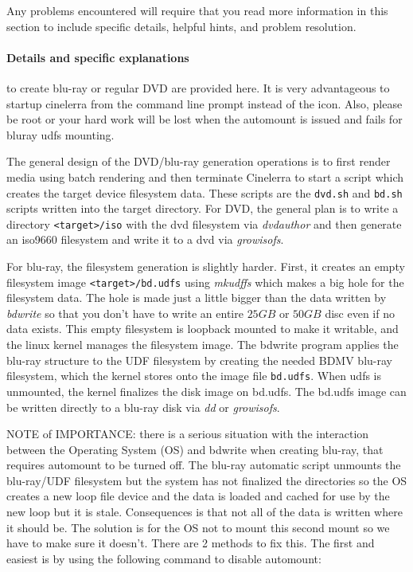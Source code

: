 Any problems encountered will require that you read more information in this section to include specific details, helpful hints, and problem resolution.

\paragraph{Details and specific explanations} to create blu-ray or regular DVD are provided here.  It is very advantageous to startup cinelerra from the command line prompt instead of the icon.  Also, please be root or your hard work will be lost when the automount is issued and fails for bluray udfs mounting.

The general design of the DVD/blu-ray generation operations is to first render media using batch rendering and then terminate Cinelerra to start a script which creates the target device filesystem data.  These scripts are the \texttt{dvd.sh} and \texttt{bd.sh} scripts written into the target directory.  For DVD, the general plan is to write a directory \texttt{<target>/iso} with the dvd filesystem via \textit{dvdauthor} and then generate an iso9660 filesystem and write it to a dvd via \textit{growisofs}.  

For blu-ray, the filesystem generation is slightly harder.  First, it creates an empty filesystem image \texttt{<target>/bd.udfs} using \textit{mkudffs} which makes a big hole for the filesystem data. The hole is made just a little bigger than the data written by \textit{bdwrite} so that you don't have to write an entire $25GB$ or $50GB$ disc even if no data exists. This empty filesystem is loopback mounted to make it writable, and the linux kernel manages the filesystem image. The bdwrite program applies the blu-ray structure to the UDF filesystem by creating the needed BDMV blu-ray filesystem, which the kernel stores onto the image file \texttt{bd.udfs}.  When udfs is unmounted, the kernel finalizes the disk image on bd.udfs.  The bd.udfs image can be written directly to a blu-ray disk via \textit{dd} or \textit{growisofs}. 

NOTE of IMPORTANCE: there is a serious situation with the interaction between the Operating System (OS) and bdwrite when creating blu-ray, that requires automount to be turned off.  The blu-ray automatic script unmounts the blu-ray/UDF filesystem but the system has not finalized the directories so the OS creates a new loop file device and the data is loaded and cached for use by the new loop but it is stale.  Consequences is that not all of the data is written where it should be.  The solution is for the OS not to mount this second mount so we have to make sure it doesn't.  There are 2 methods to fix this.  The first and easiest is by using the following command to disable automount:

